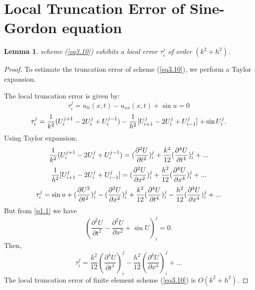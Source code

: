 \documentclass[10pt,letterpaper,twoside]{article}
\newtheorem{lemma}[theorem]{Lemma}
\begin{document}
\section{Local Truncation Error of Sine-Gordon equation}
\begin{lemma}
  scheme (\ref{eq3.10}) exhibits a local error $\tau _{i}^{j}$  of order  $(k^2+h^{2})$.
\end{lemma}
\begin{proof}
 To estimate the truncation error of scheme (\ref{eq3.10}), we perform a Taylor expansion.

The local truncation error is given by:
 \begin{equation*}
  \tau_{i}^{j}=u_{tt}(x,t)-u_{xx}(x,t)+\sin u=0
 \end{equation*}
 \begin{equation}
  \tau_{i}^{j}=\frac{1}{k^{2}}(U_{i}^{j+1}-2U_{i}^{j}+U_{i}^{j-1})-\frac{1}{%
   h^{2}}[U_{i+1}^{j}-2U_{i}^{j}+U_{i-1}^{j}]+\sin U_{i}^{j}.  
 \end{equation}
Using Taylor expansion:
 \begin{equation}
  \frac{1}{k^{2}}(U_{i}^{j+1}-2U_{i}^{j}+U_{i}^{j-1})=(\frac{\partial ^{2}U}{%
   \partial t^{2}})_{i}^{j}+\frac{k^{2}}{12}(\frac{\partial ^{4}U}{%
   \partial t^{4}})_{i}^{j}+...  
 \end{equation}
 \begin{equation}
  \frac{1}{h^{2}}[U_{i+1}^{j}-2U_{i}^{j}+U_{i-1}^{j}]=(\frac{\partial ^{2}U}{%
   \partial x^{2}})_{i}^{j}+\frac{h^{2}}{12}(\frac{\partial ^{4}U}{%
   \partial x^{4}})_{i}^{j}+...  
 \end{equation}
 \begin{equation}
  \tau_{i}^{j}=\sin u+(\frac{\partial U ^{2}}{\partial t^{2}})_{i}^{j}-(\frac{%
   \partial ^{2}U}{\partial x^{2}})_{i}^{j}+\frac{k^{2}}{12}(\frac{%
   \partial ^{4}U}{\partial t^{4}})_{i}^{j}-\frac{h^{2}}{12}(\frac{%
   \partial ^{4}U}{\partial x^{4}})_{i}^{j}+...  
 \end{equation}
 But from \eqref{p1.1} we have
 \begin{equation*}
  (\frac{\partial ^{2}U}{\partial t^{2}}-\frac{\partial ^{2}U}{\partial x^{2}}%
  +\sin U)_{i}^{j}=0.
 \end{equation*}
Then,
 \begin{equation}
  \tau_{i}^{j}=\frac{k^{2}}{12}(\frac{\partial ^{4}U}{\partial
   t^{4}})_{i}^{j}-\frac{h^{2}}{12}(\frac{\partial ^{4}U}{\partial x^{4}})_{i}^{j}%
  +... 
 \end{equation}
  The local truncation error of finite element
scheme (\ref{eq3.10}) is $O(k^{2}+h^{2})$.
\end{proof}
\end{document}
